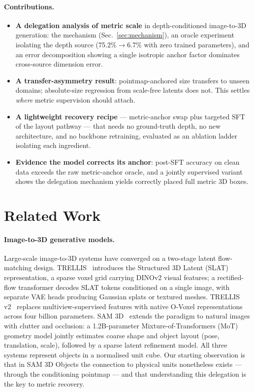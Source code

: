\documentclass[runningheads]{llncs}
\begin{document}
\paragraph{Contributions.}
\begin{itemize}
  \item \textbf{A delegation analysis of metric scale} in depth-conditioned image-to-3D
        generation: the mechanism (Sec.~\ref{sec:mechanism}), an oracle experiment
        isolating the depth source (75.2\%$\to$6.7\% with zero trained parameters), and
        an error decomposition showing a single isotropic anchor factor dominates
        cross-source dimension error.
  \item \textbf{A transfer-asymmetry result}: pointmap-anchored size transfers to unseen
        domains; absolute-size regression from scale-free latents does not. This settles
        \emph{where} metric supervision should attach.
  \item \textbf{A lightweight recovery recipe} --- metric-anchor swap plus targeted SFT of
        the layout pathway --- that needs no ground-truth depth, no new architecture, and
        no backbone retraining, evaluated as an ablation ladder isolating each ingredient.
  \item \textbf{Evidence the model corrects its anchor}: post-SFT accuracy on clean data
        exceeds the raw metric-anchor oracle, and a jointly supervised variant shows the
        delegation mechanism yields correctly placed full metric 3D boxes.
\end{itemize}

\section{Related Work}
\label{sec:related}

\paragraph{Image-to-3D generative models.}
Large-scale image-to-3D systems have converged on a two-stage latent flow-matching design.
TRELLIS~\cite{trellis} introduces the Structured 3D Latent (SLAT) representation, a sparse
voxel grid carrying DINOv2 visual features; a rectified-flow transformer decodes SLAT tokens
conditioned on a single image, with separate VAE heads producing Gaussian splats or textured
meshes. TRELLIS v2~\cite{trellis2} replaces multiview-supervised features with native O-Voxel
representations across four billion parameters. SAM 3D~\cite{sam3d} extends the paradigm to
natural images with clutter and occlusion: a 1.2B-parameter Mixture-of-Transformers (MoT)
geometry model jointly estimates coarse shape and object layout (pose, translation, scale),
followed by a sparse latent refinement model. All three systems represent objects in a
normalised unit cube. Our starting observation is that in SAM 3D Objects the connection to
physical units nonetheless exists --- through the conditioning pointmap --- and that
understanding this delegation is the key to metric recovery.
\end{document}
